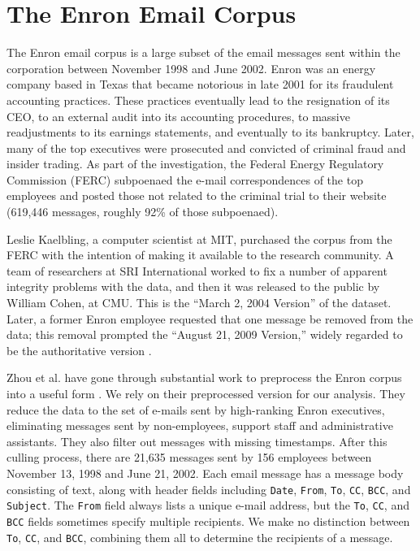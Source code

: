 \documentclass[aoas,preprint]{imsart}
\begin{document}
\section{The Enron Email Corpus}\label{S:enron-corpus}

The Enron email corpus is a large subset of the email messages sent within the
corporation between November 1998 and June 2002. Enron was an energy company
based in Texas that became notorious in late 2001 for its fraudulent
accounting practices. These practices eventually lead to the resignation of
its CEO, to an external audit into its accounting procedures, to massive
readjustments to its earnings statements, and eventually to its bankruptcy.
Later, many of the top executives were prosecuted and convicted of criminal
fraud and insider trading. As part of the investigation, the Federal Energy
Regulatory Commission (FERC) subpoenaed the e-mail correspondences of the top
employees and posted those not related to the criminal trial to their website
(619,446 messages, roughly 92\% of those subpoenaed).

Leslie Kaelbling, a computer scientist at MIT, purchased the corpus from the
FERC with the intention of making it available to the research community. A
team of researchers at SRI International worked to fix a number of apparent
integrity problems with the data, and then it was released to the public by
William Cohen, at CMU. This is the ``March 2, 2004 Version'' of the dataset.
Later, a former Enron employee requested that one message be removed from the
data; this removal prompted the ``August 21, 2009 Version,'' widely regarded
to be the authoritative version \cite{cohen2009enron}.

Zhou et al. have gone through substantial work to preprocess the Enron corpus
into a useful form \cite{zhou2007strategies}. We rely on their preprocessed
version for our analysis. They reduce the data to the set of e-mails sent by
high-ranking Enron executives, eliminating messages sent by non-employees,
support staff and administrative assistants. They also filter out messages
with missing timestamps. After this culling process, there are 21,635 messages
sent by 156 employees between November 13, 1998 and June 21, 2002. Each email
message has a message body consisting of text, along with header fields
including \texttt{Date}, \texttt{From}, \texttt{To}, \texttt{CC},
\texttt{BCC}, and \texttt{Subject}. The \texttt{From} field always lists a
unique e-mail address, but the \texttt{To}, \texttt{CC}, and \texttt{BCC}
fields sometimes specify multiple recipients. We make no distinction between
\texttt{To}, \texttt{CC}, and \texttt{BCC}, combining them all to determine
the recipients of a message.
\end{document}
